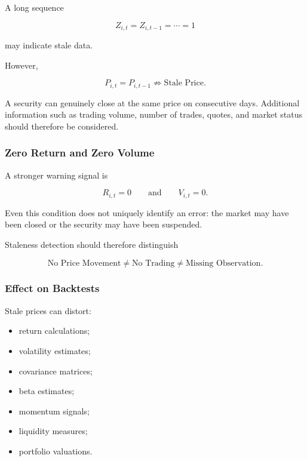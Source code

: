 \documentclass[11pt,a4paper]{article}
\begin{document}
A long sequence

\begin{equation}
Z_{i,t}
=
Z_{i,t-1}
=
\cdots
=
1
\end{equation}

may indicate stale data.

However,

\begin{equation}
\boxed{
P_{i,t}=P_{i,t-1}
\not\Rightarrow
\text{Stale Price}.
}
\end{equation}

A security can genuinely close at the same price on consecutive days.
Additional information such as trading volume, number of trades, quotes, and
market status should therefore be considered.


\subsubsection{Zero Return and Zero Volume}

A stronger warning signal is

\begin{equation}
R_{i,t}=0
\qquad\text{and}\qquad
V_{i,t}=0.
\end{equation}

Even this condition does not uniquely identify an error: the market may have
been closed or the security may have been suspended.

Staleness detection should therefore distinguish

\begin{equation}
\boxed{
\text{No Price Movement}
\neq
\text{No Trading}
\neq
\text{Missing Observation}.
}
\end{equation}


\subsubsection{Effect on Backtests}

Stale prices can distort:

\begin{itemize}
    \item return calculations;
    \item volatility estimates;
    \item covariance matrices;
    \item beta estimates;
    \item momentum signals;
    \item liquidity measures;
    \item portfolio valuations.
\end{itemize}
\end{document}
